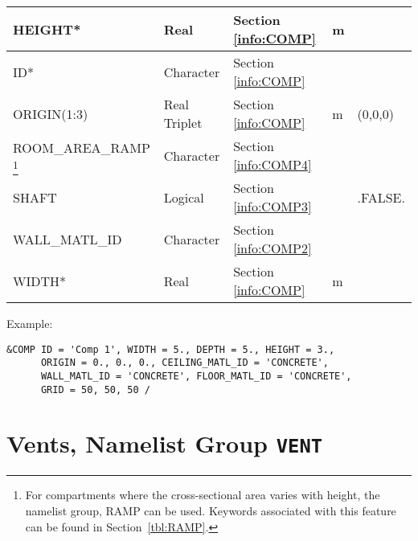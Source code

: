 \begin{minipage}{6.5in}
\begin{longtable}{|l|l|l|l|l@{\extracolsep{\fill}}|}
{\ct HEIGHT}*                & Real     		 & Section \ref{info:COMP}   	          & m         &                 \\ \hline
{\ct ID}*                    & Character		 & Section \ref{info:COMP}                &           &          \\ \hline
{\ct ORIGIN(1:3)}           & Real Triplet   & Section \ref{info:COMP}                & m         & (0,0,0)                \\ \hline
{\ct ROOM\_AREA\_RAMP}
\footnote{For compartments where the cross-sectional area varies with height, the namelist group, {\ct RAMP} can be used. Keywords associated with this feature can be found in Section~\ref{tbl:RAMP}.}
                            & Character          & Section \ref{info:COMP4}                 &           &                 \\ \hline
{\ct SHAFT}                 & Logical  		 & Section \ref{info:COMP3}                 &           & {\ct .FALSE.}   \\ \hline
{\ct WALL\_MATL\_ID}        & Character		 & Section \ref{info:COMP2}                 &           &                 \\ \hline
{\ct WIDTH}*                 & Real               & Section \ref{info:COMP}                  & m         &                 \\ \hline
\end{longtable}
\end{minipage}

\vspace{\baselineskip}
\noindent Example:
\begin{lstlisting}
&COMP ID = 'Comp 1', WIDTH = 5., DEPTH = 5., HEIGHT = 3.,
      ORIGIN = 0., 0., 0., CEILING_MATL_ID = 'CONCRETE',
      WALL_MATL_ID = 'CONCRETE', FLOOR_MATL_ID = 'CONCRETE',
      GRID = 50, 50, 50 /
\end{lstlisting}




\clearpage
\section{Vents, Namelist Group \texorpdfstring{{\tt VENT}}{VENT}}
\label{info:VENT6}

